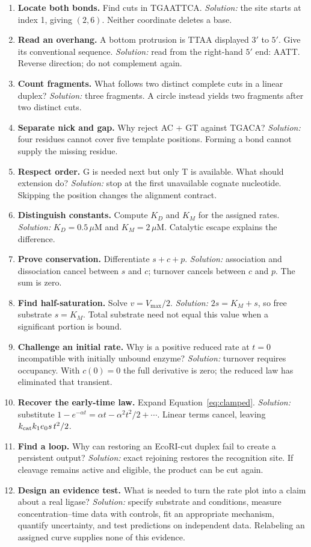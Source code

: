 \begin{enumerate}
\item \textbf{Locate both bonds.} Find cuts in TGAATTCA.
\emph{Solution:} the site starts at index 1, giving $(2,6)$. Neither coordinate deletes a base.
\item \textbf{Read an overhang.} A bottom protrusion is TTAA displayed $3'$ to $5'$. Give its conventional sequence.
\emph{Solution:} read from the right-hand $5'$ end: AATT. Reverse direction; do not complement again.
\item \textbf{Count fragments.} What follows two distinct complete cuts in a linear duplex?
\emph{Solution:} three fragments. A circle instead yields two fragments after two distinct cuts.
\item \textbf{Separate nick and gap.} Why reject AC + GT against TGACA?
\emph{Solution:} four residues cannot cover five template positions. Forming a bond cannot supply the missing residue.
\item \textbf{Respect order.} G is needed next but only T is available. What should extension do?
\emph{Solution:} stop at the first unavailable cognate nucleotide. Skipping the position changes the alignment contract.
\item \textbf{Distinguish constants.} Compute $K_D$ and $K_M$ for the assigned rates.
\emph{Solution:} $K_D=0.5\,\mu$M and $K_M=2\,\mu$M. Catalytic escape explains the difference.
\item \textbf{Prove conservation.} Differentiate $s+c+p$.
\emph{Solution:} association and dissociation cancel between $s$ and $c$; turnover cancels between $c$ and $p$. The sum is zero.
\item \textbf{Find half-saturation.} Solve $v=V_{\max}/2$.
\emph{Solution:} $2s=K_M+s$, so free substrate $s=K_M$. Total substrate need not equal this value when a significant portion is bound.
\item \textbf{Challenge an initial rate.} Why is a positive reduced rate at $t=0$ incompatible with initially unbound enzyme?
\emph{Solution:} turnover requires occupancy. With $c(0)=0$ the full derivative is zero; the reduced law has eliminated that transient.
\item \textbf{Recover the early-time law.} Expand Equation~\ref{eq:clamped}.
\emph{Solution:} substitute $1-e^{-\alpha t}=\alpha t-\alpha^2t^2/2+\cdots$. Linear terms cancel, leaving $k_{\rm cat}k_1e_0s\,t^2/2$.
\item \textbf{Find a loop.} Why can restoring an EcoRI-cut duplex fail to create a persistent output?
\emph{Solution:} exact rejoining restores the recognition site. If cleavage remains active and eligible, the product can be cut again.
\item \textbf{Design an evidence test.} What is needed to turn the rate plot into a claim about a real ligase?
\emph{Solution:} specify substrate and conditions, measure concentration--time data with controls, fit an appropriate mechanism, quantify uncertainty, and test predictions on independent data. Relabeling an assigned curve supplies none of this evidence.
\end{enumerate}

